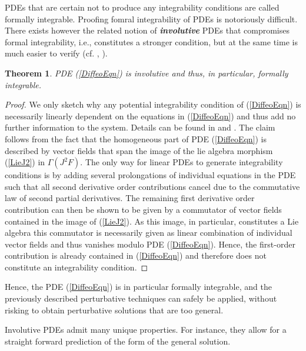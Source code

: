 \documentclass[%
 reprint,
nofootinbib,
 amsmath,amssymb,
 aps,
 prd,
floatfix,
]{revtex4-2}
\newtheorem{theorem}{Theorem}
\begin{document}
PDEs that are certain not to produce any integrability conditions are called formally integrable.
Proofing fomral integrability of PDEs is notoriously difficult. There exists however the related notion of \textit{\textbf{involutive}} PDEs that compromises formal integrability, i.e., constitutes a stronger condition, but at the same time is much easier to verify (cf. \cite{seiler2009involution}, \cite{seiler1994analysis}).  
\begin{theorem}
PDE (\ref{DiffeoEqn}) is involutive and thus, in particular, formally integrable.
\end{theorem}
\begin{proof}
We only sketch why any potential integrability condition of (\ref{DiffeoEqn}) is necessarily linearly dependent on the equations in  (\ref{DiffeoEqn}) and thus add no further information to the system.
Details can be found in \cite{seiler1994analysis} and \cite{TobiMaster}.
The claim follows from the fact that the homogeneous part of PDE (\ref{DiffeoEqn}) is described by vector fields that span the image of the lie algebra morphism (\ref{LieJ2}) in $\Gamma(J^2F)$. The only way for linear PDEs to generate integrability conditions is by adding several prolongations of individual equations in the PDE such that all second derivative order contributions cancel due to the commutative law of second partial derivatives. The remaining first derivative order contribution can then be shown to be given by a commutator of vector fields contained in the image of (\ref{LieJ2}). As this image, in particular, constitutes a Lie algebra this commutator is necessarily given as linear combination of individual vector fields and thus vanishes modulo PDE (\ref{DiffeoEqn}). Hence, the first-order contribution is already contained in (\ref{DiffeoEqn}) and therefore does not constitute an integrability condition. 
\end{proof}
Hence, the PDE (\ref{DiffeoEqn}) is in particular formally integrable, and the previously described perturbative techniques can safely be applied, without risking to obtain perturbative solutions that are too general. 

Involutive PDEs admit many unique properties. For instance, they allow for a straight forward prediction of the form of the general solution.
\end{document}
